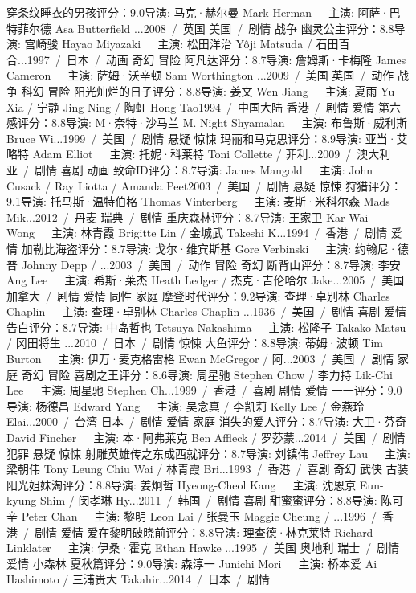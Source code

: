 穿条纹睡衣的男孩评分：9.0导演: 马克·赫尔曼 Mark Herman   主演: 阿萨·巴特菲尔德 Asa Butterfield ...2008 / 英国 美国 / 剧情 战争
幽灵公主评分：8.8导演: 宫崎骏 Hayao Miyazaki   主演: 松田洋治 Yôji Matsuda / 石田百合...1997 / 日本 / 动画 奇幻 冒险
阿凡达评分：8.7导演: 詹姆斯·卡梅隆 James Cameron   主演: 萨姆·沃辛顿 Sam Worthington ...2009 / 美国 英国 / 动作 战争 科幻 冒险
阳光灿烂的日子评分：8.8导演: 姜文 Wen Jiang   主演: 夏雨 Yu Xia / 宁静 Jing Ning / 陶虹 Hong Tao1994 / 中国大陆 香港 / 剧情 爱情
第六感评分：8.8导演: M·奈特·沙马兰 M. Night Shyamalan   主演: 布鲁斯·威利斯 Bruce Wi...1999 / 美国 / 剧情 悬疑 惊悚
玛丽和马克思评分：8.9导演: 亚当·艾略特 Adam Elliot   主演: 托妮·科莱特 Toni Collette / 菲利...2009 / 澳大利亚 / 剧情 喜剧 动画
致命ID评分：8.7导演: James Mangold   主演: John Cusack / Ray Liotta / Amanda Peet2003 / 美国 / 剧情 悬疑 惊悚
狩猎评分：9.1导演: 托马斯·温特伯格 Thomas Vinterberg   主演: 麦斯·米科尔森 Mads Mik...2012 / 丹麦 瑞典 / 剧情
重庆森林评分：8.7导演: 王家卫 Kar Wai Wong   主演: 林青霞 Brigitte Lin / 金城武 Takeshi K...1994 / 香港 / 剧情 爱情
加勒比海盗评分：8.7导演: 戈尔·维宾斯基 Gore Verbinski   主演: 约翰尼·德普 Johnny Depp / ...2003 / 美国 / 动作 冒险 奇幻
断背山评分：8.7导演: 李安 Ang Lee   主演: 希斯·莱杰 Heath Ledger / 杰克·吉伦哈尔 Jake...2005 / 美国 加拿大 / 剧情 爱情 同性 家庭
摩登时代评分：9.2导演: 查理·卓别林 Charles Chaplin   主演: 查理·卓别林 Charles Chaplin ...1936 / 美国 / 剧情 喜剧 爱情
告白评分：8.7导演: 中岛哲也 Tetsuya Nakashima   主演: 松隆子 Takako Matsu / 冈田将生 ...2010 / 日本 / 剧情 惊悚
大鱼评分：8.8导演: 蒂姆·波顿 Tim Burton   主演: 伊万·麦克格雷格 Ewan McGregor / 阿...2003 / 美国 / 剧情 家庭 奇幻 冒险
喜剧之王评分：8.6导演: 周星驰 Stephen Chow / 李力持 Lik-Chi Lee   主演: 周星驰 Stephen Ch...1999 / 香港 / 喜剧 剧情 爱情
一一评分：9.0导演: 杨德昌 Edward Yang   主演: 吴念真 / 李凯莉 Kelly Lee / 金燕玲 Elai...2000 / 台湾 日本 / 剧情 爱情 家庭
消失的爱人评分：8.7导演: 大卫·芬奇 David Fincher   主演: 本·阿弗莱克 Ben Affleck / 罗莎蒙...2014 / 美国 / 剧情 犯罪 悬疑 惊悚
射雕英雄传之东成西就评分：8.7导演: 刘镇伟 Jeffrey Lau   主演: 梁朝伟 Tony Leung Chiu Wai / 林青霞 Bri...1993 / 香港 / 喜剧 奇幻 武侠 古装
阳光姐妹淘评分：8.8导演: 姜炯哲 Hyeong-Cheol Kang   主演: 沈恩京 Eun-kyung Shim / 闵孝琳 Hy...2011 / 韩国 / 剧情 喜剧
甜蜜蜜评分：8.8导演: 陈可辛 Peter Chan   主演: 黎明 Leon Lai / 张曼玉 Maggie Cheung / ...1996 / 香港 / 剧情 爱情
爱在黎明破晓前评分：8.8导演: 理查德·林克莱特 Richard Linklater   主演: 伊桑·霍克 Ethan Hawke ...1995 / 美国 奥地利 瑞士 / 剧情 爱情
小森林 夏秋篇评分：9.0导演: 森淳一 Junichi Mori   主演: 桥本爱 Ai Hashimoto / 三浦贵大 Takahir...2014 / 日本 / 剧情
